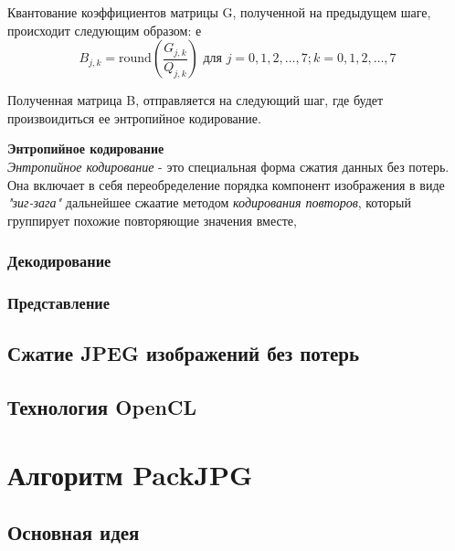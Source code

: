 \documentclass{matmex-diploma-custom}
\begin{document}
Квантование коэффициентов матрицы  G, полученной на предыдущем шаге, происходит следующим образом:
е
$$B_{j,k} = \mathrm{round} \left( \frac{G_{j,k}}{Q_{j,k}} \right) \mbox{ для } j=0,1,2,\ldots,7; k=0,1,2,\ldots,7$$


  Полученная матрица B, отправляется на следующий шаг, где будет произвоидиться ее энтропийное кодирование.

\textbf{Энтропийное кодирование}\\

\emph{Энтропийное кодирование} - это специальная форма сжатия данных без потерь. Она включает в себя переобределение порядка компонент изображения в виде \emph{"зиг-зага"} дальнейшее сжаатие методом \emph{кодирования повторов}, который группирует похожие повторяющие значения вместе,
\subsubsection{Декодирование}
\subsubsection{Представление}
\subsection{Сжатие JPEG изображений без потерь}
\subsection{Технология OpenCL}
\section{Алгоритм PackJPG}
\subsection{Основная идея}
\end{document}
